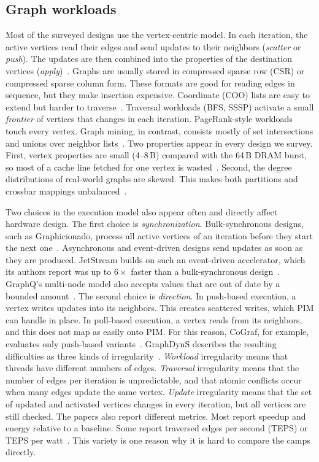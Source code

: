 \documentclass[journal,onecolumn]{IEEEtran}
\begin{document}
\subsection{Graph workloads}
Most of the surveyed designs use the vertex-centric model. In each iteration, the active vertices read their edges and send updates to their neighbors (\emph{scatter} or \emph{push}). The updates are then combined into the properties of the destination vertices (\emph{apply})~\cite{ham2016graphicionado,yenimol2026cograf}. Graphs are usually stored in compressed sparse row (CSR) or compressed sparse column form. These formats are good for reading edges in sequence, but they make insertion expensive. Coordinate (COO) lists are easy to extend but harder to traverse~\cite{asquini2025tc}. Traversal workloads (BFS, SSSP) activate a small \emph{frontier} of vertices that changes in each iteration. PageRank-style workloads touch every vertex. Graph mining, in contrast, consists mostly of set intersections and unions over neighbor lists~\cite{besta2021sisa}. Two properties appear in every design we survey. First, vertex properties are small (4--8\,B) compared with the 64\,B DRAM burst, so most of a cache line fetched for one vertex is wasted~\cite{shin2025piccolo}. Second, the degree distributions of real-world graphs are skewed. This makes both partitions and crossbar mappings unbalanced~\cite{zheng2020spara,cai2024pimpam}.

Two choices in the execution model also appear often and directly affect hardware design. The first choice is \emph{synchronization}. Bulk-synchronous designs, such as Graphicionado, process all active vertices of an iteration before they start the next one~\cite{ham2016graphicionado}. Asynchronous and event-driven designs send updates as soon as they are produced. JetStream builds on such an event-driven accelerator, which its authors report was up to $6\times$ faster than a bulk-synchronous design~\cite{rahman2021jetstream}. GraphQ's multi-node model also accepts values that are out of date by a bounded amount~\cite{zhuo2019graphq}. The second choice is \emph{direction}. In push-based execution, a vertex writes updates into its neighbors. This creates scattered writes, which PIM can handle in place. In pull-based execution, a vertex reads from its neighbors, and this does not map as easily onto PIM. For this reason, CoGraf, for example, evaluates only push-based variants~\cite{yenimol2026cograf}. GraphDynS describes the resulting difficulties as three kinds of irregularity~\cite{yan2019graphdyns}. \emph{Workload} irregularity means that threads have different numbers of edges. \emph{Traversal} irregularity means that the number of edges per iteration is unpredictable, and that atomic conflicts occur when many edges update the same vertex. \emph{Update} irregularity means that the set of updated and activated vertices changes in every iteration, but all vertices are still checked. The papers also report different metrics. Most report speedup and energy relative to a baseline. Some report traversed edges per second (TEPS) or TEPS per watt~\cite{lee2022graphwave}. This variety is one reason why it is hard to compare the camps directly.
\end{document}
